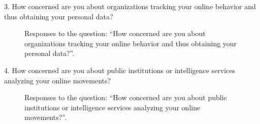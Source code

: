 \vspace{2cm}

3. How concerned are you about organizations tracking your online behavior and thus obtaining your personal data?

\begin{figure}[H]
    \begin{center}
        \caption*{Responses to the question: ``How concerned are you about organizations tracking your online behavior and thus obtaining your personal data?''.}
        \label{fig:survey_s3_q3}
    \end{center}
\end{figure}

4. How concerned are you about public institutions or intelligence services analyzing your online movements?

\begin{figure}[H]
    \begin{center}
        \caption*{Responses to the question: ``How concerned are you about public institutions or intelligence services analyzing your online movements?''.}
        \label{fig:survey_s3_q4}
    \end{center}
\end{figure}

